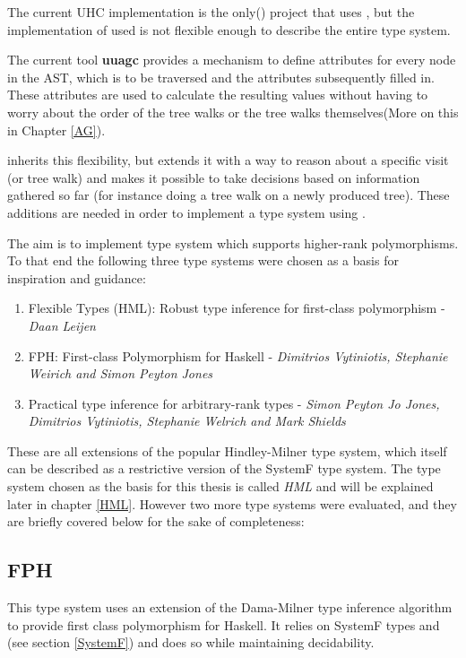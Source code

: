 The current UHC implementation is the only(\cite{UHC}) project that uses \ags, but the implementation of \ags used is not flexible enough to describe the entire type system.

The current \ag tool \textbf{uuagc} provides a mechanism to define attributes for every node in the AST, which is to be traversed and the attributes subsequently filled in. These attributes are used to calculate the resulting values without having to worry about the order of the tree walks or the tree walks themselves(More on this in Chapter \ref{AG}).

\Rcore inherits this flexibility, but extends it with a way to reason about a specific visit (or tree walk) and makes it possible to take decisions based on information gathered so far (for instance doing a tree walk on a newly produced tree). These additions are needed in order to implement a type system using \ags.

The aim is to implement type system which supports higher-rank polymorphisms. To that end the following three type systems were chosen as a basis for inspiration and guidance:

\begin{enumerate}
\item Flexible Types (HML): Robust type inference for first-class polymorphism - \textit{Daan Leijen}
\item FPH: First-class Polymorphism for Haskell - \textit{Dimitrios Vytiniotis, Stephanie Weirich and Simon Peyton Jones}
\item Practical type inference for arbitrary-rank types - \textit{Simon Peyton Jo Jones, Dimitrios Vytiniotis, Stephanie Welrich and Mark Shields}
\end{enumerate}

These are all extensions of the popular Hindley-Milner type system, which itself can be described as a restrictive version of the SystemF type system.
The type system chosen as the basis for this thesis is called \emph{HML} and will be explained later in chapter \ref{HML}. However two more type systems were evaluated, and they are briefly covered below for the sake of completeness:

\subsection{FPH\cite{FPH}}
This type system uses an extension of the Dama-Milner type inference algorithm to provide first class polymorphism for Haskell. It relies on SystemF types and (see section \ref{SystemF}) and does so while maintaining decidability. 

